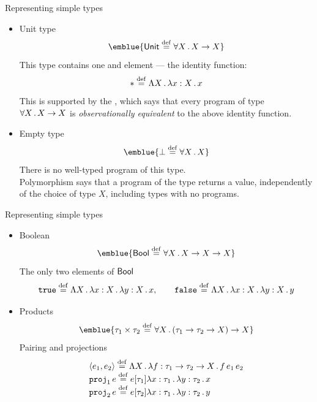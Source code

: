 \documentclass[paper=screen,mode=present,style=zysimple]{powerdot}
\begin{document}
\begin{slide}{Representing simple types}
\begin{itemize}
\item Unit type 
\[
\emblue{\tunit \defeq \forall X \ldot X \to X}
\]
This type contains one and  element --- the identity function:
\[
* \stackrel{\mathrm{def}}{=} \Lambda X \, . \, \lambda x : X \, . \, x
\]
This is supported by the , which says that every program of type 
$\forall X \, . \, X \to X$ is {\em observationally equivalent} to the above identity function.
\item Empty type
\[
\emblue{\bot \defeq \forall X \ldot X}
\]
There is no well-typed program of this type. 
\\
Polymorphism says that a program of the type returns a value, independently of the choice of type $X$, 
including types with no programs.
\end{itemize}
\end{slide}

\begin{slide}{Representing simple types}
\begin{itemize}
\item Boolean 
\[
\emblue{\tbool \defeq \forall X \ldot X \to X \to X}
\]
The only two elements of $\mathsf{Bool}$ 
\[
\mathtt{true} \stackrel{\mathrm{def}}{=} \Lambda X \, . \, \lambda x : X \, . \, \lambda y : X \, . \, x , 
\qquad
\mathtt{false} \stackrel{\mathrm{def}}{=} \Lambda X \, . \, \lambda x : X \, . \, \lambda y : X \, . \, y 
\]
\item Products
\[
\emblue{\tau_1 \times \tau_2 \defeq \forall X \ldot (\tau_1 \to \tau_2 \to X) \to X}
\]
Pairing and projections
\[
\begin{array}{l}
\langle{e_1, e_2}\rangle \stackrel{\mathrm{def}}{=} \Lambda X \, . \, \lambda f : \tau_1 \to \tau_2 \to X \, . \, f \, e_1 \, e_2
\\
\mathtt{proj}_1 \, e \stackrel{\mathrm{def}}{=} e [\tau_1] \lambda x : \tau_1 \, . \, \lambda y : \tau_2 \, . \, x
\\
\mathtt{proj}_2 \, e \stackrel{\mathrm{def}}{=} e [\tau_2] \lambda x : \tau_1 \, . \, \lambda y : \tau_2 \, . \, y
\end{array}
\]
\end{itemize}
\end{slide}
\end{document}
